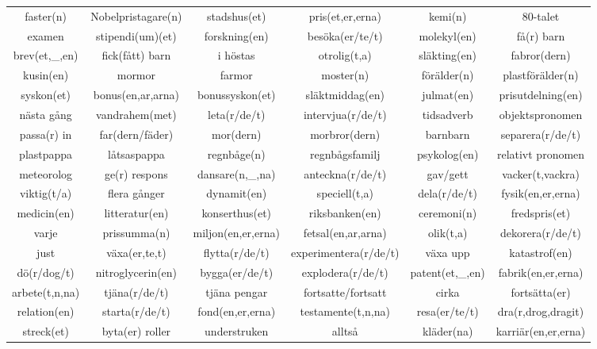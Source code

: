 \begin{center}
    \begin{adjustwidth}{-2cm}{}
        \begin{tabular}{|c c c c c c|}
            \hline
            faster(n) & Nobelpristagare(n) & stadshus(et) & pris(et,er,erna) & kemi(n) & 80-talet \\
            examen & stipendi(um)(et) & forskning(en) & besöka(er/te/t) & molekyl(en) & få(r) barn \\
            brev(et,\_,en) & fick(fått) barn & i höstas & otrolig(t,a) & släkting(en) & fabror(dern) \\
            kusin(en) & mormor & farmor & moster(n) & förälder(n) & plastförälder(n) \\
            syskon(et) & bonus(en,ar,arna) & bonussyskon(et) & släktmiddag(en) & julmat(en) & prisutdelning(en) \\
            nästa gång & vandrahem(met) & leta(r/de/t) & intervjua(r/de/t) & tidsadverb & objektspronomen \\
            passa(r) in & far(dern/fäder) & mor(dern) & morbror(dern) & barnbarn & separera(r/de/t) \\
            plastpappa & låtsaspappa & regnbåge(n) & regnbågsfamilj & psykolog(en) & relativt pronomen \\
            meteorolog & ge(r) respons & dansare(n,\_,na) & anteckna(r/de/t) & gav/gett & vacker(t,vackra) \\
            viktig(t/a) & flera gånger & dynamit(en) & speciell(t,a) & dela(r/de/t) & fysik(en,er,erna) \\
            medicin(en) & litteratur(en) & konserthus(et) & riksbanken(en) & ceremoni(n) & fredspris(et) \\
            varje & prissumma(n) & miljon(en,er,erna) & fetsal(en,ar,arna) & olik(t,a) & dekorera(r/de/t) \\
            just & växa(er,te,t) & flytta(r/de/t) & experimentera(r/de/t) & växa upp & katastrof(en) \\
            dö(r/dog/t) & nitroglycerin(en) & bygga(er/de/t) & explodera(r/de/t) & patent(et,\_,en) & fabrik(en,er,erna) \\
            arbete(t,n,na) & tjäna(r/de/t) & tjäna pengar & fortsatte/fortsatt & cirka & fortsätta(er) \\
            relation(en) & starta(r/de/t) & fond(en,er,erna) & testamente(t,n,na) & resa(er/te/t) & dra(r,drog,dragit) \\
            streck(et) & byta(er) roller & understruken & alltså & kläder(na) & karriär(en,er,erna) \\

\end{tabular}
\end{adjustwidth}
\end{center}
